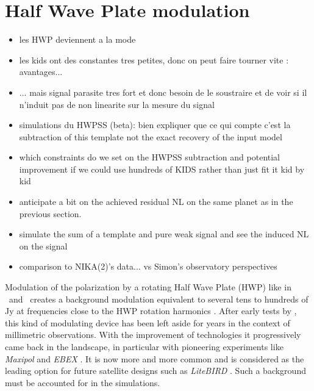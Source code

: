 
\section{Half Wave Plate modulation}

\begin{itemize}
\item les HWP deviennent a la mode
\item les kids ont des constantes tres petites, donc on peut faire tourner vite
  : avantages...
\item ... mais signal parasite tres fort et donc besoin de le soustraire et de
  voir si il n'induit pas de non linearite sur la mesure du signal
\item simulations du HWPSS (beta): bien expliquer que ce qui compte c'est la
  subtraction of this template not the exact recovery of the input model
\item which constraints do we set on the HWPSS subtraction and potential
  improvement if we could use hundreds of KIDS rather than just fit it kid by kid
\item anticipate a bit on the achieved residual NL on the same planet as in the
  previous section.
\item simulate the sum of a template and pure weak signal and see the induced NL
  on the signal
\item comparison to NIKA(2)'s data... vs Simon's observatory perspectives
\end{itemize}

{\color{blue}
Modulation of the polarization by a rotating Half Wave Plate (HWP) like in
\nika\ and \nikad\ creates a background modulation equivalent to several tens to
hundreds of Jy at frequencies close to the HWP rotation harmonics
\citep{2017A&A...599A..34R}. After early tests by , this kind of modulating device has been left aside for
 years in the context of millimetric observations. With the
improvement of technologies it progressively came back in the landscape, in
particular with pioneering experiments like \emph{Maxipol}
\citep{2007ApJ...665...42J} and \emph{EBEX} \citep{2010SPIE.7741E..1CR}. It is
now more and more common and is considered as the leading option for future
satellite designs such as \emph{LiteBIRD} . Such a background must
be accounted for in the simulations.}



